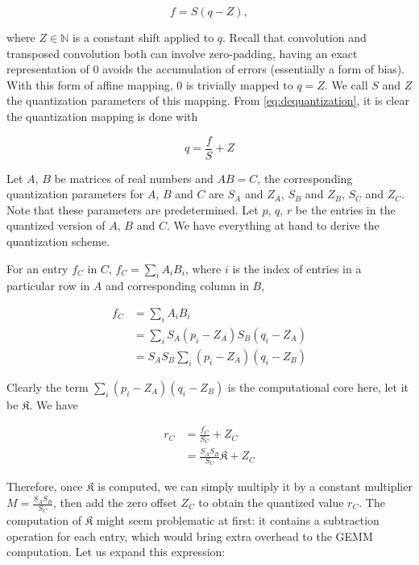 \begin{equation} \label{eq:dequantization}
  f = S(q - Z),
\end{equation}

where $Z \in \mathbb{N}$ is a constant shift applied to $q$. Recall that convolution and transposed convolution
both can involve zero-padding, having an exact representation of $0$ avoids the accumulation of errors
(essentially a form of bias). With this form of affine mapping, $0$ is trivially mapped to $q = Z$. We call
$S$ and $Z$ the quantization parameters of this mapping. From \ref{eq:dequantization}, it is clear the
quantization mapping is done with

\begin{equation} \label{eq:quantization}
  q = \frac{f}{S} + Z
\end{equation}

Let $A$, $B$ be matrices of real numbers and $A B = C$, the corresponding quantization parameters for $A$,
$B$ and $C$ are $S_A$ and $Z_A$, $S_B$ and $Z_B$, $S_C$ and $Z_C$. Note that these parameters are
predetermined. Let $p$, $q$, $r$ be the entries in the quantized version of $A$, $B$ and $C$. We have
everything at hand to derive the quantization scheme.

For an entry $f_C$ in $C$, $f_C = \sum_{i}^{} A_i B_i$, where $i$ is the index of entries in a particular
row in $A$ and corresponding column in $B$,

\begin{equation}
\begin{split}
  f_C & = \sum_{i}^{} A_i B_i \\
      & = \sum_{i}^{} S_A (p_i - Z_A) S_B (q_i - Z_A) \\
      & = S_A S_B \sum_{i}^{} (p_i - Z_A) (q_i - Z_B)
\end{split}
\end{equation}

Clearly the term $\sum_{i}^{} (p_i - Z_A) (q_i - Z_B)$ is the computational core here, let it be
$\mathfrak{K}$. We have

\begin{equation}
\begin{split}
  r_C & = \frac{f_C}{S_C} + Z_C \\
      & = \frac{S_A S_B}{S_C} \mathfrak{K} + Z_C
\end{split}
\end{equation}

Therefore, once $\mathfrak{K}$ is computed, we can simply multiply it by a constant multiplier
$M = \frac{S_A S_B}{S_C}$, then add the zero offset $Z_C$ to obtain the quantized value $r_C$. The computation
of $\mathfrak{K}$ might seem problematic at first: it contains a subtraction operation for each entry,
which would bring extra overhead to the GEMM computation. Let us expand this expression:

